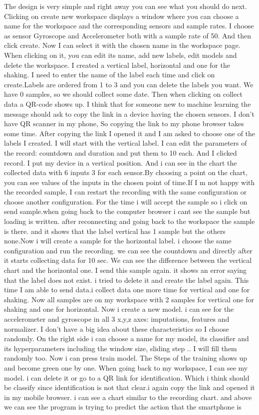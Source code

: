 The design is very simple and right away you can see what you should do next. Clicking on create new workspace displays a window where you can choose a name for the workspace and the corresponding sensors and sample rates. I choose as sensor Gyroscope and Accelerometer both with a sample rate of 50. And then click create. Now I can select it with the chosen name in the workspace page. When clicking on it, you can edit its name, add new labels, edit models and delete the workspace.  I created a vertical label, horizontal and one for the shaking. I need to enter the name of the label each time and click on create.Labels are ordered from 1 to 3 and you can delete the labels you want. We have 0 samples, so we should collect some date. Then when clicking on collect data a QR-code shows up. I think that for someone new to machine learning the message should ask to copy the link in a device having the chosen sensors. I don't have QR scanner in my phone, So copying the link to my phone browser takes some time. After copying the link I opened it and I am asked to choose one of the labels I created. I will start with the vertical label. I can edit the parameters of the record: countdown and duration and put them to 10 each. And I clicked record. I put my device in a vertical position. And i can see in the chart the collected data with 6 inputs 3 for each sensor.By choosing a point on the chart, you can see values of the inputs in the chosen point of time.If I m not happy with the recorded sample, I can restart the recording with the same configuration or choose another configuration. For the time i will accept the sample so i click on send sample.when going back to the computer browser i cant see the sample but loading is written. after reconnecting and going back to the workspace the sample is there. and it shows that the label vertical has 1 sample but the others none.Now i will create a sample for the horizontal label. i choose the same configuration and run the recording. we can see the countdown and directly after it starts collecting data for 10 sec. We can see the difference between the vertical chart and the horizontal one. I send this sample again. it shows an error saying that the label does not exist. i tried to delete it and create the label again. This time I am able to send data.i collect data one more time for vertical and one for shaking. Now all samples are on my workspace with 2 samples for vertical one for shaking and one for horizontal. Now i create a new model. i can see for the accelerometer and gyroscope in all 3 x,y,z axes: imputations, features and normalizer. I don't have a big idea about these characteristics so I choose randomly. On the right side i can choose a name for my model, its classifier and its hyperparameters including the window size, sliding step .. I will fill them randomly too. Now i can press train model. The Steps of the training shows up and become green one by one. When going back to my workspace, I can see my model. i can delete it or go to a QR link for identification. Which i think should be classify since identification is not that clear.i again copy the link and opened it in my mobile browser. i can see a chart similar to the recording chart. and above we can see the program is trying to predict the action that the smartphone is 